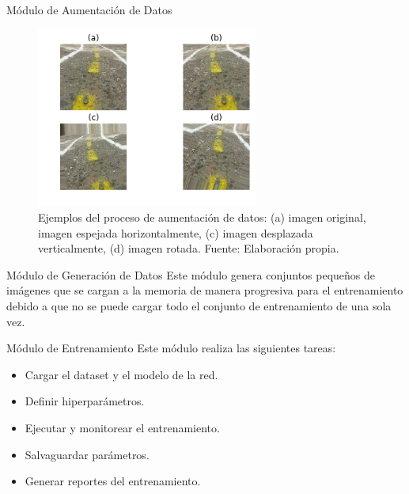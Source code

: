 \documentclass[10pt]{beamer}
\begin{document}
\begin{frame}{Módulo de Aumentación de Datos}
    \begin{figure}[!h] 
        \centering
        \includegraphics[width=0.65\textwidth]{../img/aumentacion}
        \caption[Ejemplos de aumentación de datos]{Ejemplos del proceso de aumentación de datos: (a) imagen original, 
        imagen espejada horizontalmente, (c) imagen desplazada verticalmente, (d) imagen rotada. Fuente: Elaboración propia. }
    \end{figure}

\end{frame}

\begin{frame}{Módulo de Generación de Datos}
    Este módulo genera conjuntos pequeños de imágenes que se cargan a la memoria 
    de manera progresiva para el entrenamiento debido a que no se puede cargar todo el 
    conjunto de entrenamiento de una sola vez.
\end{frame}

\begin{frame}{Módulo de Entrenamiento}
    Este módulo realiza las siguientes tareas:

    \begin{itemize}
        \item Cargar el dataset y el modelo de la red.
        \item Definir hiperparámetros.
        \item Ejecutar y monitorear el entrenamiento.
        \item Salvaguardar parámetros.
        \item Generar reportes del entrenamiento.
    \end{itemize}
\end{frame}
\end{document}
